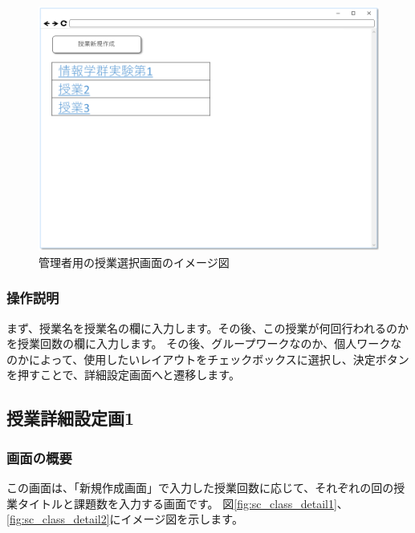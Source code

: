 \begin{figure}[htbp]
  \begin{center}
    \includegraphics[width=1\linewidth,clip]{./img/sc_select_class.png}
    \caption{管理者用の授業選択画面のイメージ図}\label{fig:sc_select_class}
  \end{center}
\end{figure}

\subsubsection{操作説明}
まず、授業名を授業名の欄に入力します。その後、この授業が何回行われるのかを授業回数の欄に入力します。
その後、グループワークなのか、個人ワークなのかによって、使用したいレイアウトをチェックボックスに選択し、決定ボタンを押すことで、詳細設定画面へと遷移します。

\subsection{授業詳細設定画1}
\subsubsection{画面の概要}
この画面は、「新規作成画面」で入力した授業回数に応じて、それぞれの回の授業タイトルと課題数を入力する画面です。
図\ref{fig:sc_class_detail1}、\ref{fig:sc_class_detail2}にイメージ図を示します。

